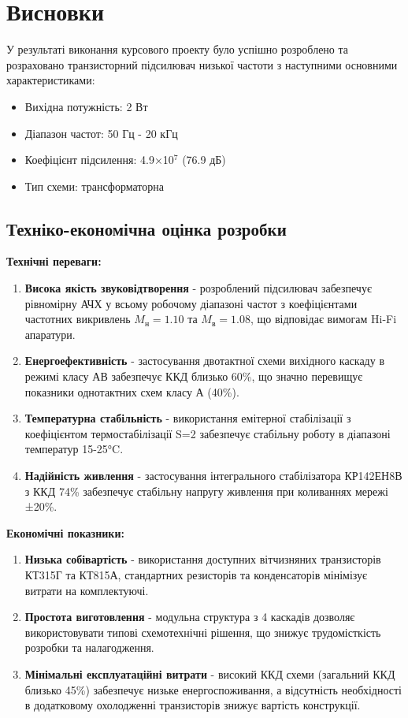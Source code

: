 \documentclass[main.tex]{subfiles}
\begin{document}
\section{Висновки}

У результаті виконання курсового проекту було успішно розроблено та розраховано транзисторний підсилювач низької частоти з наступними основними характеристиками:
\begin{itemize}
    \item Вихідна потужність: 2 Вт
    \item Діапазон частот: 50 Гц - 20 кГц
    \item Коефіцієнт підсилення: 4.9×10$^7$ (76.9 дБ)
    \item Тип схеми: трансформаторна
\end{itemize}

\subsection{Техніко-економічна оцінка розробки}

\textbf{Технічні переваги:}
\begin{enumerate}
    \item \textbf{Висока якість звуковідтворення} - розроблений підсилювач забезпечує рівномірну АЧХ у всьому робочому діапазоні частот з коефіцієнтами частотних викривлень $M_н = 1.10$ та $M_в = 1.08$, що відповідає вимогам Hi-Fi апаратури.
    
    \item \textbf{Енергоефективність} - застосування двотактної схеми вихідного каскаду в режимі класу АВ забезпечує ККД близько 60\%, що значно перевищує показники однотактних схем класу А (40\%).
    
    \item \textbf{Температурна стабільність} - використання емітерної стабілізації з коефіцієнтом термостабілізації S=2 забезпечує стабільну роботу в діапазоні температур 15-25°C.
    
    \item \textbf{Надійність живлення} - застосування інтегрального стабілізатора КР142ЕН8В з ККД 74\% забезпечує стабільну напругу живлення при коливаннях мережі ±20\%.
\end{enumerate}

\textbf{Економічні показники:}
\begin{enumerate}
    \item \textbf{Низька собівартість} - використання доступних вітчизняних транзисторів КТ315Г та КТ815А, стандартних резисторів та конденсаторів мінімізує витрати на комплектуючі.
    
    \item \textbf{Простота виготовлення} - модульна структура з 4 каскадів дозволяє використовувати типові схемотехнічні рішення, що знижує трудомісткість розробки та налагодження.
    
    \item \textbf{Мінімальні експлуатаційні витрати} - високий ККД схеми (загальний ККД близько 45\%) забезпечує низьке енергоспоживання, а відсутність необхідності в додатковому охолодженні транзисторів знижує вартість конструкції.
\end{enumerate}
\end{document}
